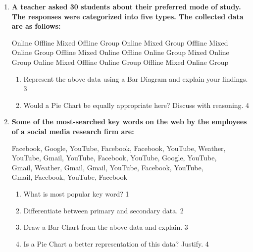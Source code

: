 \documentclass[a4paper,oneside]{book}
\begin{document}
    \begin{enumerate}
    
    \item
\textbf{A teacher asked 30 students about their preferred mode of study. The responses were categorized into five types. The collected data are as follows:}

\begin{centering}
Online  Offline  Mixed  Offline  Group  Online  Mixed  Group  Offline  Mixed \\
Online  Group    Offline Mixed   Online Offline Online  Group  Mixed   Online \\
Group   Online   Mixed  Offline  Online Group   Offline Mixed   Online Group \\
\end{centering}

\begin{enumerate}
  \item  
  Represent the above data using a Bar Diagram and explain your findings. \hfill 3
  \item
  Would a Pie Chart be equally appropriate here? Discuss with reasoning. \hfill 4
\end{enumerate}

    
         \item
	  \textbf{Some of the most-searched key words on the web by the employees of a social media research firm are:}
	  
	  \begin{center}
    Facebook, Google, YouTube, Facebook, Facebook, YouTube, Weather, \\
YouTube, Gmail, YouTube, Facebook, YouTube, Google, YouTube, \\
Gmail, Weather, Gmail, Gmail, YouTube, Facebook, YouTube, \\
Gmail, Facebook, YouTube, Facebook
    \end{center}
    
  
  \begin{enumerate}
    \item What is most popular key word? \hfill 1
    \item Differentiate between primary and secondary data. \hfill 2
    \item  
	Draw a Bar Chart from the above data and explain. \hfill 3
    \item
	Is a Pie Chart a better representation of this data? Justify. \hfill 4
  \end{enumerate}
  

\end{enumerate}
\end{document}
